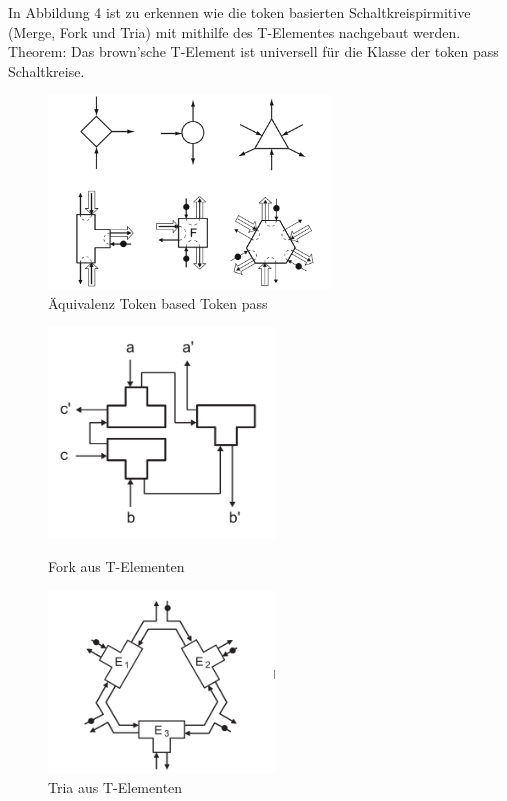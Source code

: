 \documentclass[11pt,a4paper]{article}
\begin{document}
In Abbildung 4 ist zu erkennen wie die token basierten Schaltkreispirmitive 
(Merge, Fork und Tria) mit mithilfe des T-Elementes nachgebaut werden.
%
Theorem: Das brown'sche T-Element ist universell für die Klasse der token pass 
Schaltkreise.

\begin{figure}[h]
    \centering 
    \centering
    \includegraphics[width=7.5cm]{bilder/BasedToPass.png}
    \caption{Äquivalenz Token based Token pass}
\end{figure}


\begin{figure}[h]
     \begin{minipage}{0.45\textwidth}
        \centering
        \includegraphics[width=6cm]{bilder/TP_Fork.png}
        \caption{Fork aus T-Elementen}
    \end{minipage}\hfill
     \begin{minipage}{0.45\textwidth}
        \centering
        \includegraphics[width=6cm]{bilder/TP_Tria.png}
        \caption{Tria aus T-Elementen}
    \end{minipage}\hfill
\end{figure}    
\end{document}
